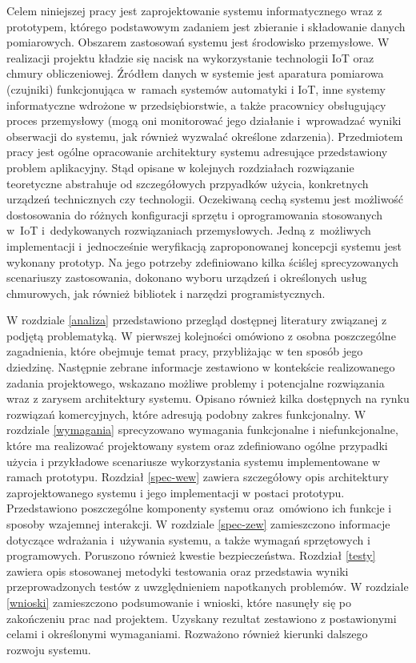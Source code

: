 \documentclass[a4paper, 12pt, twoside]{article}
\begin{document}
Celem niniejszej pracy jest zaprojektowanie systemu informatycznego
wraz z prototypem, którego podstawowym zadaniem jest zbieranie i składowanie danych pomiarowych.
Obszarem zastosowań systemu jest środowisko przemysłowe.
W realizacji projektu kładzie się nacisk na wykorzystanie technologii IoT
oraz chmury obliczeniowej. Źródłem danych w systemie
jest aparatura pomiarowa (czujniki) funkcjonująca w~ramach systemów automatyki i IoT,
inne systemy informatyczne wdrożone w przedsiębiorstwie,
a także pracownicy obsługujący proces przemysłowy (mogą oni monitorować jego działanie
i~wprowadzać wyniki obserwacji do systemu, jak również wyzwalać określone zdarzenia).
Przedmiotem pracy jest ogólne opracowanie architektury
systemu adresujące przedstawiony problem aplikacyjny. Stąd opisane w kolejnych rozdziałach
rozwiązanie teoretyczne abstrahuje od szczegółowych przpyadków użycia, konkretnych urządzeń
technicznych czy technologii. Oczekiwaną cechą systemu jest możliwość dostosowania
do różnych konfiguracji sprzętu i oprogramowania stosowanych w~IoT i~dedykowanych
rozwiązaniach przemysłowych. Jedną z~możliwych implementacji i~jednocześnie weryfikacją
zaproponowanej koncepcji systemu jest wykonany prototyp. Na jego potrzeby zdefiniowano
kilka ściślej sprecyzowanych scenariuszy zastosowania, dokonano wyboru urządzeń
i określonych usług chmurowych, jak również bibliotek i narzędzi programistycznych.

W rozdziale \ref{analiza} przedstawiono przegląd dostępnej literatury związanej z podjętą problematyką.
W pierwszej kolejności omówiono z osobna poszczególne zagadnienia, które
obejmuje temat pracy, przybliżając w ten sposób jego dziedzinę.
Następnie zebrane informacje zestawiono w kontekście realizowanego zadania projektowego,
wskazano możliwe problemy i potencjalne rozwiązania wraz z zarysem architektury
systemu. Opisano również kilka dostępnych na rynku rozwiązań komercyjnych,
które adresują podobny zakres funkcjonalny. W rozdziale \ref{wymagania} sprecyzowano
wymagania funkcjonalne i niefunkcjonalne, które ma realizować projektowany system
oraz zdefiniowano ogólne przypadki użycia i przykładowe scenariusze wykorzystania systemu
implementowane w ramach prototypu. Rozdział \ref{spec-wew} zawiera
szczegółowy opis architektury zaprojektowanego systemu i jego implementacji
w postaci prototypu. Przedstawiono poszczególne
komponenty systemu oraz~omówiono ich funkcje i sposoby wzajemnej interakcji.
W rozdziale \ref{spec-zew} zamieszczono informacje dotyczące
wdrażania i~używania systemu, a także wymagań sprzętowych i programowych.
Poruszono również kwestie bezpieczeństwa. Rozdział \ref{testy} zawiera
opis stosowanej metodyki testowania oraz przedstawia wyniki przeprowadzonych
testów z uwzględnieniem napotkanych problemów. W rozdziale \ref{wnioski} zamieszczono
podsumowanie i wnioski, które nasunęły się po zakończeniu prac nad projektem.
Uzyskany rezultat zestawiono z postawionymi celami i określonymi wymaganiami.
Rozważono również kierunki dalszego rozwoju systemu.
\end{document}
